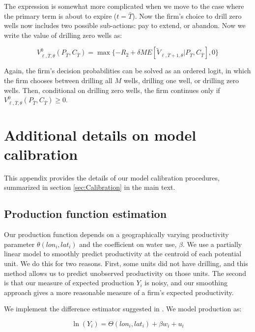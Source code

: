 \documentclass[12pt]{article}
\begin{document}
The expression is somewhat more complicated when we move to the case where the primary term is about to expire ($t = \bar{T}$). Now the firm's choice to drill zero wells now includes two possible sub-actions: pay to extend, or abandon. Now we write the value of drilling zero wells as:

\begin{equation}
V^0_{\ell,\bar{T},\theta}(P_{\bar{T}},C_{\bar{T}}) = \max \{ - R_2 + \delta M E[\tilde{V}_{\ell,\bar{T}+1,\theta}|P_{\bar{T}},C_{\bar{T}}] , 0 \}
\end{equation}

Again, the firm's decision probabilities can be solved as an ordered logit, in which the firm chooses between drilling all $M$ wells, drilling one well, or drilling zero wells. Then, conditional on drilling zero wells, the firm continues only if $V^0_{\ell,\bar{T},\theta}(P_{\bar{T}},C_{\bar{T}}) \geq 0$.


\section{Additional details on model calibration \label{appx:calibration}}

This appendix provides the details of our model calibration procedures, summarized in section \ref{sec:Calibration} in the main text.

\subsection{Production function estimation}

Our production function depends on a geographically varying productivity parameter $\theta(lon_i,lat_i)$ and the coefficient on water use, $\beta$. We use a partially linear model to smoothly predict productivity at the centroid of each potential unit. We do this for two reasons. First, some units did not have drilling, and this method allows us to predict unobserved productivity on those units. The second is that our measure of expected production $Y_i$ is noisy, and our smoothing approach gives a more reasonable measure of a firm's expected productivity.

We implement the difference estimator suggested in \citet{bib:robinson}. We model production as:

\begin{equation}
\ln(Y_i) = \Theta(lon_i,lat_i) + \beta w_i + u_i
\end{equation}
\end{document}
